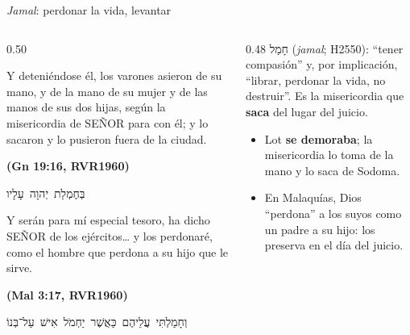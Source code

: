 \documentclass[hyperref={bookmarks=false},aspectratio=169]{beamer}
\newcommand{\heb}[1]{\mbox{\foreignlanguage{hebrew}{#1}}}
\newcommand{\SENOR}{S{\fontsize{0.78em}{1em}\selectfont EÑOR}}
\newcommand{\fuente}[1]{\par\hfill{\upshape\bfseries\footnotesize\textcolor{azul}{#1}}}
\newcommand{\destacar}[1]{\textbf{\textcolor{azul}{#1}}}
\begin{document}
\begin{frame}{\emph{Jamal}: perdonar la vida, levantar}
\begin{columns}[t,onlytextwidth]
\begin{column}{0.50\textwidth}
\begin{cita}Y deteniéndose él, los varones asieron de su mano, y de la mano de su mujer y de las manos de sus dos hijas, según la misericordia de \SENOR{} para con él; y lo sacaron y lo pusieron fuera de la ciudad.\fuente{(Gn 19:16, RVR1960)}\end{cita}
\begin{center}\heb{בְּחֶמְלַת יְהוָה עָלָיו}\end{center}
\begin{cita}Y serán para mí especial tesoro, ha dicho \SENOR{} de los ejércitos\ldots{} y los perdonaré, como el hombre que perdona a su hijo que le sirve.\fuente{(Mal 3:17, RVR1960)}\end{cita}
\begin{center}\heb{וְחָמַלְתִּי עֲלֵיהֶם כַּאֲשֶׁר יַחְמֹל אִישׁ עַל־בְּנוֹ}\end{center}
\end{column}
\begin{column}{0.48\textwidth}\scriptsize
\heb{חָמַל} (\emph{jamal}; H2550): ``tener compasión'' y, por implicación, ``librar, perdonar la vida, no destruir''. Es la misericordia que \destacar{saca} del lugar del juicio.\par\medskip
\small
\begin{itemize}
\item Lot \destacar{se demoraba}; la misericordia lo toma de la mano y lo saca de Sodoma.
\item En Malaquías, Dios ``perdona'' a los suyos como un padre a su hijo: los preserva en el día del juicio.
\end{itemize}
\end{column}
\end{columns}
\end{frame}
\end{document}
